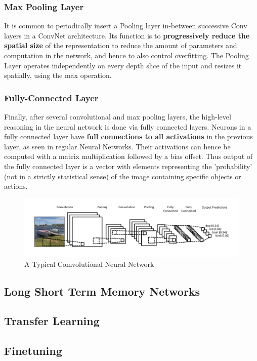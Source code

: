 \documentclass{article}
\begin{document}
				\subsubsection{Max Pooling Layer}
					It is common to periodically insert a Pooling layer in-between successive Conv layers in a ConvNet architecture. Its function is to \textbf{progressively reduce the spatial size} of the representation to reduce the amount of parameters and computation in the network, and hence to also control overfitting. The Pooling Layer operates independently on every depth slice of the input and resizes it spatially, using the max operation.
				\subsubsection{Fully-Connected Layer}
					Finally, after several convolutional and max pooling layers, the high-level reasoning in the neural network is done via fully connected layers. Neurons in a fully connected layer have \textbf{full connections to all activations} in the previous layer, as seen in regular Neural Networks. Their activations can hence be computed with a matrix multiplication followed by a bias offset. Thus output of the fully connected layer is a vector with elements representing the 'probability' (not in a strictly statistical sense) of the image containing specific objects or actions.
				\begin{figure}[ht!]
					\includegraphics[width=14cm]{conv.png}
					\caption{A Typical Comvolutional Neural Network\label{fig4}}
				\end{figure}
			\subsection{Long Short Term Memory Networks}
								

			\subsection{Transfer Learning}

			\subsection{Finetuning}
			
\end{document}
